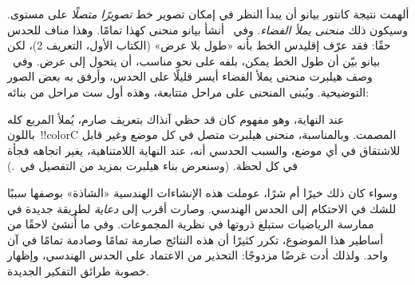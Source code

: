 \documentclass[../../../include/open-logic-section]{subfiles}
\begin{document}
ألهمت نتيجة كانتور بيانو أن يبدأ النظر في إمكان تصوير خط
\emph{تصويرًا متصلًا} على مستوى. وسيكون ذلك \emph{منحنى يملأ الفضاء}.
وفي~\citeyear{Peano1890} أنشأ بيانو منحنى كهذا تمامًا. وهذا مناف
للحدس حقًا: فقد عرّف إقليدس الخط بأنه «طول بلا عرض» (الكتاب الأول،
التعريف 2)، لكن بيانو بيّن أن طول الخط يمكن، بلفه على نحو مناسب، أن
يتحول إلى عرض. وفي~\citeyear{Hilbert1891} وصف هيلبرت منحنى يملأ الفضاء
أيسر قليلًا على الحدس، وأرفق به بعض الصور التوضيحية. ويُبنى المنحنى
على مراحل متتابعة، وهذه أول ست مراحل من بنائه:
\begin{center}
\end{center}
عند النهاية، وهو مفهوم كان قد حظي آنذاك بتعريف صارم، يُملأ المربع كله
باللون~!!{colorC} المصمت. وبالمناسبة، منحنى هيلبرت متصل في كل موضع
وغير قابل للاشتقاق في أي موضع، والسبب الحدسي أنه، عند النهاية
اللامتناهية، يغير اتجاهه فجأة في كل لحظة. (وسنعرض بناء هيلبرت بمزيد من
التفصيل في~.)

وسواء كان ذلك خيرًا أم شرًا، عوملت هذه الإنشاءات الهندسية «الشاذة»
بوصفها سببًا للشك في الاحتكام إلى الحدس الهندسي. وصارت أقرب إلى
\emph{دعاية} لطريقة جديدة في ممارسة الرياضيات ستبلغ ذروتها في نظرية
المجموعات. وفي ما أُنشئ لاحقًا من أساطير هذا الموضوع، تكرر كثيرًا أن
هذه النتائج صارمة تمامًا وصادمة تمامًا في آن واحد. ولذلك أدت غرضًا
مزدوجًا: التحذير من الاعتماد على الحدس الهندسي، وإظهار خصوبة طرائق
التفكير الجديدة.
\end{document}
